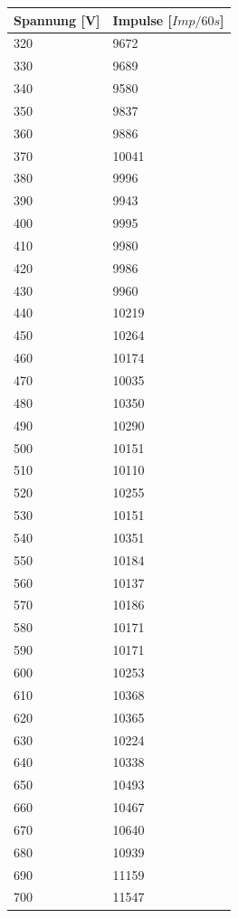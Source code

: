 \begin{minipage}{\linewidth}
    \begin{table}[H]
        \centering
    
    \begin{tabular}{ll}
        \toprule
        Spannung [V] & Impulse [$Imp/60s$]\\
        \midrule
        320 &	9672   \\   
        330 &	9689   \\  
        340 &	9580   \\   
        350 &	9837   \\   
        360 &	9886   \\    
        370 &	10041  \\    
        380 &	9996   \\   
        390 &	9943   \\   
        400 &	9995   \\   
        410 &	9980   \\    
        420 &	9986   \\   
        430 &	9960   \\  
        440 &	10219  \\
        450 &	10264  \\
        460 &	10174  \\
        470 &	10035  \\
        480 &	10350  \\
        490 &	10290  \\
        500 &	10151  \\
        510 &	10110  \\
        520 &	10255  \\
        530 &	10151  \\
        540 &	10351  \\
        550 &	10184  \\
        560 &	10137  \\
        570 &	10186  \\
        580 &	10171  \\
        590 &	10171  \\
        600 &	10253  \\
        610 &	10368  \\
        620 &	10365  \\
        630 &	10224  \\
        640 &	10338  \\
        650 &	10493  \\
        660 &	10467  \\
        670 &	10640  \\
        680 &	10939  \\
        690 &	11159  \\
        700 &	11547  \\      
        \bottomrule
        
    \end{tabular}
    \label{tab:7a}
    \end{table}
    \end{minipage}

